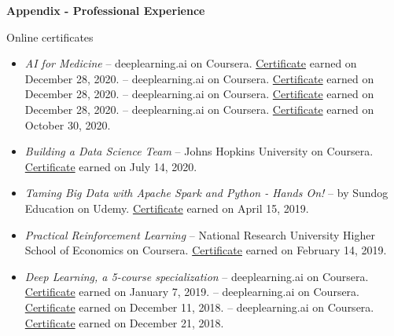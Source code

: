 \hfil{\Large{\bf Appendix - Professional Experience}}\hfil\\
\nameskip\break

\begin{rSection}{Online certificates}
  \begin{itemize}
    \item{\it AI for Medicine} -- deeplearning.ai on Coursera.
    \href{https://coursera.org/share/a208516d9700b313892fb19e95b38e78}{Certificate} earned on December 28, 2020.
     -- deeplearning.ai on Coursera.
    \href{https://coursera.org/share/5325598bd8a4862adbb4a99a1c4df461}{Certificate} earned on December 28, 2020.
     -- deeplearning.ai on Coursera.
    \href{https://coursera.org/share/21111ea9a3a4c300b742c49320301fd7}{Certificate} earned on December 28, 2020.
     -- deeplearning.ai on Coursera.
    \href{https://coursera.org/share/aea6e47d93de58241709766351f714aa}{Certificate} earned on October 30, 2020.
    \item{\it Building a Data Science Team} -- Johns Hopkins University on Coursera.
    \href{https://coursera.org/share/9d296dc31002fa58759569a1e2ebcddc}{Certificate} earned on July 14, 2020.
    \item{\it Taming Big Data with Apache Spark and Python - Hands On!} -- by Sundog Education on Udemy. \href{https://www.udemy.com/certificate/UC-G53DWS5V/}{Certificate} earned on April 15, 2019.
    \item {\it Practical Reinforcement Learning} -- National Research University Higher School of Economics on Coursera. \href{https://coursera.org/share/7dbaef1de4f13d7016316a4dd7eece8a}{Certificate} earned on February 14, 2019.
    \item{\it Deep Learning, a 5-course specialization} -- deeplearning.ai on Coursera. \href{https://coursera.org/share/47b1d9ff10e34c9d26c75f5f0914379b}{Certificate} earned on January 7, 2019.
     -- deeplearning.ai on Coursera. \href{https://coursera.org/share/b99cfdbf684af876690916f62a41f74d}{Certificate} earned on December 11, 2018.
     -- deeplearning.ai on Coursera. \href{https://coursera.org/share/70436cea6ad8695c56da96f285739488}{Certificate} earned on December 21, 2018.

\end{itemize}
\end{rSection}
